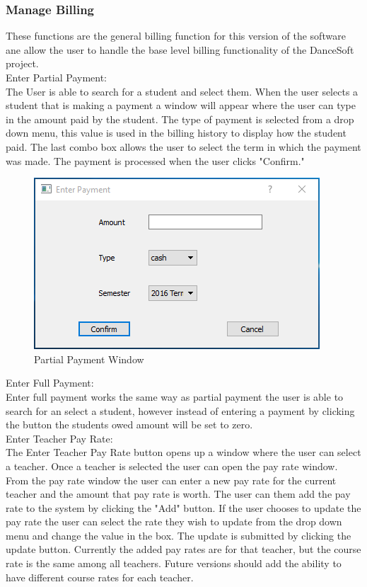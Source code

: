 \subsubsection{Manage Billing}
These functions are the general billing function for this version of the software ane allow the user to handle the base level billing functionality of the DanceSoft project.\\

Enter Partial Payment:\\
The User is able to search for a student and select them. When the user selects a student that is making a payment a window will appear where the user can type in the amount paid by the student. The type of payment is selected from a drop down menu, this value is used in the billing history to display how the student paid. The last combo box allows the user to select the term in which the payment was made. The payment is processed when the user clicks "Confirm."\\

\begin{figure}
  \includegraphics[width=\linewidth]{pics/userGuide/partPay.png}
  \caption{Partial Payment Window} 
  \label{fig:User doc: Partial Payment}
\end{figure}
  
Enter Full Payment:\\
Enter full payment works the same way as partial payment the user is able to search for an select a student, however instead of entering a payment by clicking the button the students owed amount will be set to zero.\\

Enter Teacher Pay Rate:\\
The Enter Teacher Pay Rate button opens up a window where the user can select a teacher. Once a teacher is selected the user can open the pay rate window. From the pay rate window the user can enter a new pay rate for the current teacher and the amount that pay rate is worth. The user can them add the pay rate to the system by clicking the "Add" button. If the user chooses to update the pay rate the user can select the rate they wish to update from the drop down menu and change the value in the box. The update is submitted by clicking the update button. Currently the added pay rates are for that teacher, but the course rate is the same among all teachers. Future versions should add the ability to have different course rates for each teacher.\\\

